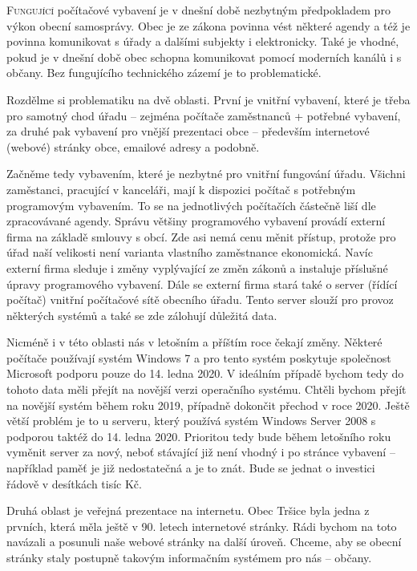 \documentclass{article}
\begin{document}
\begin{multicols}{3}{


\lettrine{F}{ungující} počítačové vybavení je v dnešní době nezbytným předpokladem pro výkon obecní samosprávy. Obec je ze zákona povinna vést některé agendy a též je povinna komunikovat s úřady a dalšími subjekty i elektronicky. Také je vhodné, pokud je v dnešní době obec schopna komunikovat pomocí moderních kanálů i s občany. Bez fungujícího technického zázemí je to problematické.

Rozdělme si problematiku na dvě oblasti. První je vnitřní vybavení, které je třeba pro samotný chod úřadu – zejména počítače zaměstnanců + potřebné vybavení, za druhé pak vybavení pro vnější prezentaci obce – především internetové (webové) stránky obce, emailové adresy a podobně.

Začněme tedy vybavením, které je nezbytné pro vnitřní fungování úřadu. Všichni zaměstanci, pracující v kanceláři, mají k dispozici počítač s potřebným programovým vybavením. To se na jednotlivých počítačích částečně liší dle zpracovávané agendy. Správu většiny programového vybavení provádí externí firma na základě smlouvy s obcí. Zde asi nemá cenu měnit přístup, protože pro úřad naší velikosti není varianta vlastního zaměstnance ekonomická. Navíc externí firma sleduje i změny vyplývající ze změn zákonů a instaluje příslušné úpravy programového vybavení. Dále se externí firma stará také o server (řídící počítač) vnitřní počítačové sítě obecního úřadu. Tento server slouží pro provoz některých systémů a také se zde zálohují důležitá data.

Nicméně i v této oblasti nás v letošním a příštím roce čekají změny. Některé počítače používají systém Windows 7 a pro tento systém poskytuje společnost Microsoft podporu pouze do 14. ledna 2020. V ideálním případě bychom tedy do tohoto data měli přejít na novější verzi operačního systému. Chtěli bychom přejít na novější systém během roku 2019, případně dokončit přechod v roce 2020. Ještě větší problém je to u serveru, který používá systém Windows Server 2008 s podporou taktéž do 14. ledna 2020. Prioritou tedy bude během letošního roku vyměnit server za nový, neboť stávající již není vhodný i po stránce vybavení – například paměť je již nedostatečná a je to znát. Bude se jednat o investici řádově v desítkách tisíc Kč.

Druhá oblast je veřejná prezentace na internetu. Obec Tršice byla jedna z prvních, která měla ještě v 90. letech internetové stránky. Rádi bychom na toto navázali a posunuli naše webové stránky na další úroveň. Chceme, aby se obecní stránky staly postupně takovým informačním systémem pro nás – občany.

}
\end{multicols}
\end{document}
